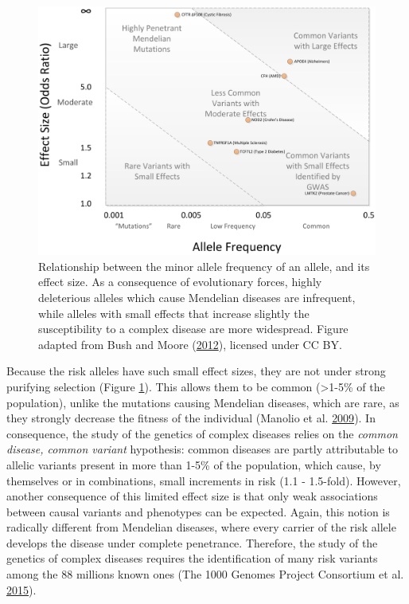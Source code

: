\documentclass[
  11pt,
]{env/yjiao}
\begin{document}
\begin{figure}
\centering
\includegraphics{fig/dl_frequency_vs_effect_size.png}
\caption{\label{fig:size-freq}Relationship between the minor allele frequency of an allele, and its effect size. As a consequence of evolutionary forces, highly deleterious alleles which cause Mendelian diseases are infrequent, while alleles with small effects that increase slightly the susceptibility to a complex disease are more widespread. Figure adapted from Bush and Moore (\protect\hyperlink{ref-bush_chapter_2012}{2012}), licensed under CC BY.}
\end{figure}

Because the risk alleles have such small effect sizes, they are not under strong purifying selection (Figure \ref{fig:size-freq}). This allows them to be common (\textgreater1-5\% of the population), unlike the mutations causing Mendelian diseases, which are rare, as they strongly decrease the fitness of the individual (Manolio et al. \protect\hyperlink{ref-manolio_finding_2009}{2009}). In consequence, the study of the genetics of complex diseases relies on the \emph{common disease, common variant} hypothesis: common diseases are partly attributable to allelic variants present in more than 1-5\% of the population, which cause, by themselves or in combinations, small increments in risk (1.1 - 1.5-fold). However, another consequence of this limited effect size is that only weak associations between causal variants and phenotypes can be expected. Again, this notion is radically different from Mendelian diseases, where every carrier of the risk allele develops the disease under complete penetrance. Therefore, the study of the genetics of complex diseases requires the identification of many risk variants among the 88 millions known ones (The 1000 Genomes Project Consortium et al. \protect\hyperlink{ref-the_1000_genomes_project_consortium_global_2015}{2015}).
\end{document}
